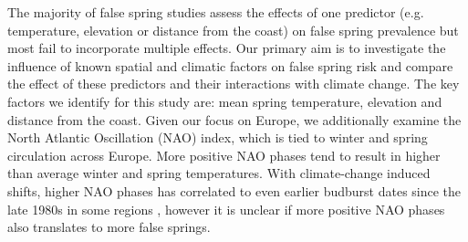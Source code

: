 \documentclass{article}\usepackage[]{graphicx}\usepackage[]{color}
\begin{document}
The majority of false spring studies assess the effects of one predictor (e.g. temperature, elevation or distance from the coast) on false spring prevalence but most fail to incorporate multiple effects. Our primary aim is to investigate the influence of known spatial and climatic factors on false spring risk and compare the effect of these predictors and their interactions with climate change. The key factors we identify for this study are: mean spring temperature, elevation and distance from the coast. Given our focus on Europe, we additionally examine the North Atlantic Oscillation (NAO) index, which is tied to winter and spring circulation across Europe. More positive NAO phases tend to result in higher than average winter and spring temperatures. With climate-change induced shifts, higher NAO phases has correlated to even earlier budburst dates since the late 1980s in some regions \citep{Chmielewski2001}, however it is unclear if more positive NAO phases also translates to more false springs.
\end{document}
